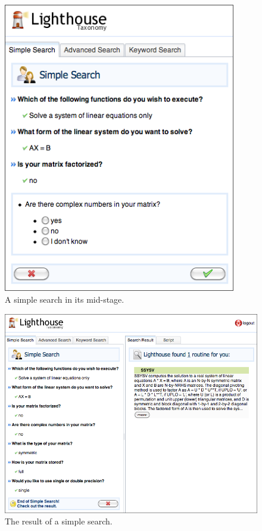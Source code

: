 \begin{figure}[h!]\label{simplesearch2}
  \centering
  \includegraphics[width=4in]{figs/simplesearch2}
  \caption[A simple search in its mid-stage]
   {A simple search in its mid-stage.}
\end{figure}

 \begin{figure}[h!]\label{simplesearch3}
  \centering
  \includegraphics[width=5in]{figs/simplesearch3}
  \caption[The result of a simple search]
   {The result of a simple search.}
\end{figure}

